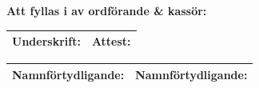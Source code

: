 \documentclass[7pt,a4paper]{article}
\newcommand{\signbox}[3]{

\vspace{2cm}
#1  \\
\vspace{5mm}\\
\line(1,0){150}\\
 #2 \\ #3\newpage}
\begin{document}
\vspace*{\fill}

\renewcommand{\dateseparator}{-} %
\renewcommand{\arraystretch}{2.0}





\textbf{Att fyllas i av ordförande \& kassör:} \\

\begin{tabular}{|p{8cm}|p{8cm}|}
\hline
Underskrift: & Attest: \\ \hline
\end{tabular}

\begin{tabular}{|p{8cm}|p{8cm}|}
Namnförtydligande: & Namnförtydligande:  \\ \hline
\end{tabular}\\


\vspace*{\fill}
\end{document}
